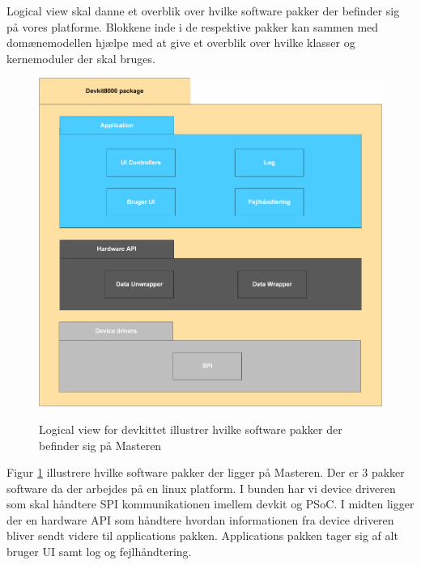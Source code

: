 
Logical view skal danne et overblik over hvilke software pakker der befinder sig på vores platforme. Blokkene inde i de respektive pakker kan sammen med domænemodellen hjælpe med at give et overblik over hvilke klasser og kernemoduler der skal bruges.

\begin{figure}[htbp] \centering
{\includegraphics[scale=0.7]{filer/systemarkitektur/logical_view_devkit}}
\caption{Logical view for devkittet illustrer hvilke software pakker der befinder sig på Masteren }
\label{fig:Logical View Devkit8000}
\end{figure}

Figur \ref{fig:Logical View Devkit8000} illustrere hvilke software pakker der ligger på Masteren. Der er 3 pakker software da der arbejdes på en linux platform. I bunden har vi device driveren som skal håndtere SPI kommunikationen imellem devkit og PSoC. I midten ligger der en hardware API som håndtere hvordan informationen fra device driveren bliver sendt videre til applications pakken. Applications pakken tager sig af alt bruger UI samt log og fejlhåndtering.

\clearpage

